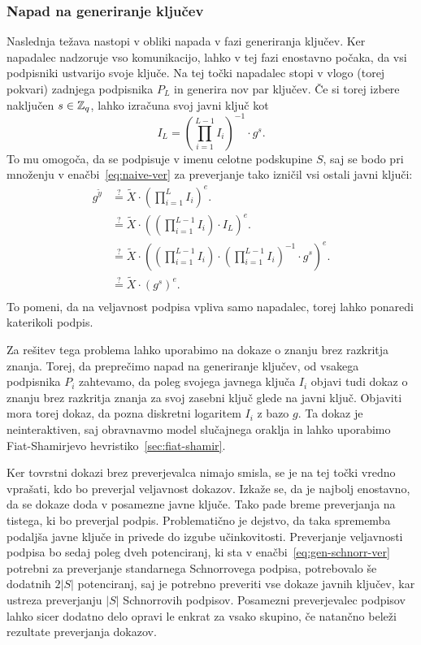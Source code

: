 \subsubsection{Napad na generiranje ključev}
Naslednja težava nastopi v obliki napada v fazi generiranja ključev. Ker napadalec nadzoruje vso
komunikacijo, lahko v tej fazi enostavno počaka, da vsi podpisniki ustvarijo svoje ključe. Na tej
točki napadalec stopi v vlogo (torej pokvari) zadnjega podpisnika $P_L$ in generira nov par ključev.
Če si torej izbere naključen $s \in \mathbb Z_q$, lahko izračuna svoj javni ključ kot
$$
I_L = \left( \prod_{i=1}^{L-1} I_i \right)^{-1} \cdot g^s.
$$
To mu omogoča, da se podpisuje v imenu celotne podskupine $S$, saj se bodo pri množenju v
enačbi~\eqref{eq:naive-ver} za preverjanje tako izničil vsi ostali javni ključi:
\begin{align*}
    g^{\tilde{y}} &\stackrel{?}{=} \tilde{X} \cdot \left(\prod_{i=1}^L I_i \right)^{e}. \\
                   &\stackrel{?}{=} \tilde{X} \cdot \left(\left(\prod_{i=1}^{L-1} I_i \right) \cdot I_L \right)^{e}. \\
                   &\stackrel{?}{=} \tilde{X} \cdot \left(\left(\prod_{i=1}^{L-1} I_i \right) \cdot \left( \prod_{i=1}^{L-1} I_i \right)^{-1} \cdot g^s \right)^{e}. \\
                   &\stackrel{?}{=} \tilde{X} \cdot \left( g^s \right)^{e}. \\
\end{align*}
To pomeni, da na veljavnost podpisa vpliva samo napadalec, torej lahko ponaredi katerikoli podpis.

Za rešitev tega problema lahko uporabimo na dokaze o znanju brez razkritja znanja. Torej, da
preprečimo napad na generiranje ključev, od vsakega podpisnika $P_i$ zahtevamo, da poleg svojega
javnega ključa $I_i$ objavi tudi dokaz o znanju brez razkritja znanja za svoj zasebni ključ glede na
javni ključ. Objaviti mora torej dokaz, da pozna diskretni logaritem $I_i$ z bazo $g$. Ta dokaz je
neinteraktiven, saj obravnavmo model slučajnega oraklja in lahko uporabimo Fiat-Shamirjevo
hevristiko~\ref{sec:fiat-shamir}.

Ker tovrstni dokazi brez preverjevalca nimajo smisla, se je na tej točki vredno vprašati, kdo bo preverjal
veljavnost dokazov. Izkaže se, da je najbolj enostavno, da se dokaze doda v posamezne javne ključe.
Tako pade breme preverjanja na tistega, ki bo preverjal podpis. Problematično je dejstvo, da taka
sprememba podaljša javne ključe in privede do izgube učinkovitosti. Preverjanje veljavnosti podpisa
bo sedaj poleg dveh potenciranj, ki sta v enačbi~\eqref{eq:gen-schnorr-ver} potrebni za preverjanje
standarnega Schnorrovega podpisa, potrebovalo še dodatnih $2|S|$ potenciranj, saj je potrebno
preveriti vse dokaze javnih ključev, kar ustreza preverjanju $|S|$ Schnorrovih podpisov. Posamezni
preverjevalec podpisov lahko sicer dodatno delo opravi le enkrat za vsako skupino, če natančno beleži
rezultate preverjanja dokazov.

